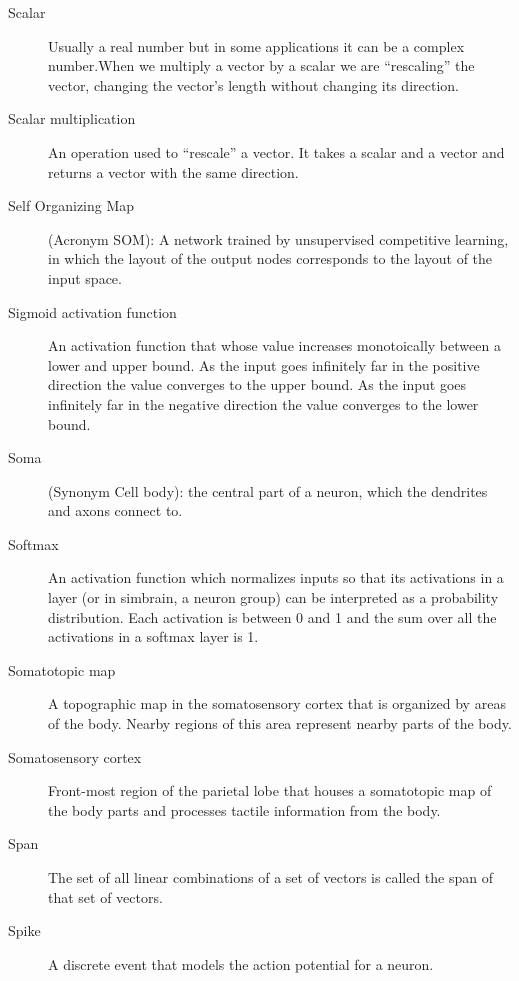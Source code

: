 \begin{description}
\item[Scalar] Usually a real number but in some applications it can be a complex number.When we multiply a vector by a scalar we are ``rescaling'' the vector, \ie changing the vector's length without changing its direction.

\item[Scalar multiplication] An operation used to ``rescale'' a vector. It takes a scalar and a vector and returns a vector with the same direction.

\item[Self Organizing Map] (Acronym SOM):  A network trained by unsupervised competitive learning, in which the layout of the output nodes corresponds to the layout of the input space.

\item[Sigmoid activation function] An activation function that whose value increases monotoically between a lower and upper bound. As the input goes infinitely far in the positive direction the value converges to the upper bound. As the input goes infinitely far in the negative direction the value converges to the lower bound.


\item[Soma] (Synonym Cell body): the central part of a neuron, which the dendrites and axons connect to.

\item[Softmax] An activation function which normalizes inputs so that its activations in a layer (or in simbrain, a neuron group) can be interpreted as a probability distribution. Each activation is between 0 and 1 and the sum over all the activations in a softmax layer is 1. 

\item[Somatotopic map] A topographic map in the somatosensory cortex that is organized by areas of the body. Nearby regions of this area represent nearby parts of the body.

\item[Somatosensory cortex] Front-most region of the parietal lobe that houses a somatotopic map of the body parts and processes tactile information from the body.

\item[Span] The set of all linear combinations of a set of vectors is called the span of that set of vectors.

\item[Spike] A discrete event that models the action potential for a neuron.


\end{description}
